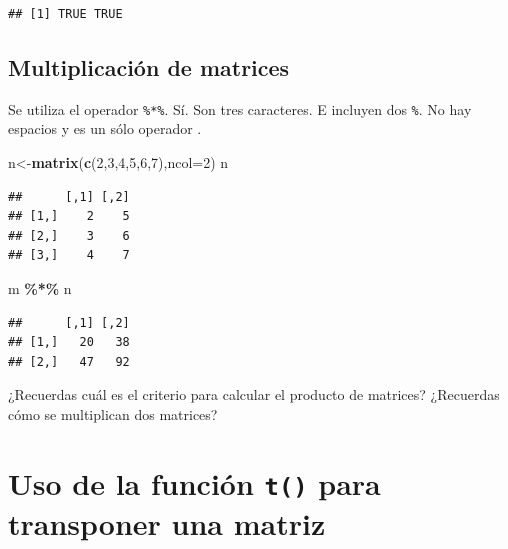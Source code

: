 \documentclass[
]{book}
\newenvironment{Shaded}{\begin{snugshade}}{\end{snugshade}}
\newcommand{\AttributeTok}[1]{\textcolor[rgb]{0.13,0.29,0.53}{#1}}
\newcommand{\DecValTok}[1]{\textcolor[rgb]{0.00,0.00,0.81}{#1}}
\newcommand{\FunctionTok}[1]{\textcolor[rgb]{0.13,0.29,0.53}{\textbf{#1}}}
\newcommand{\NormalTok}[1]{#1}
\newcommand{\OtherTok}[1]{\textcolor[rgb]{0.56,0.35,0.01}{#1}}
\newcommand{\SpecialCharTok}[1]{\textcolor[rgb]{0.81,0.36,0.00}{\textbf{#1}}}
\begin{document}
\begin{verbatim}
## [1] TRUE TRUE
\end{verbatim}

\hypertarget{multiplicaciuxf3n-de-matrices}{%
\subsection{Multiplicación de matrices}\label{multiplicaciuxf3n-de-matrices}}

Se utiliza el operador \texttt{\%*\%}. Sí. Son tres caracteres. E incluyen dos \texttt{\%}.
No hay espacios y es un sólo operador .

\begin{Shaded}
\begin{Highlighting}[]
\NormalTok{n}\OtherTok{\textless{}{-}}\FunctionTok{matrix}\NormalTok{(}\FunctionTok{c}\NormalTok{(}\DecValTok{2}\NormalTok{,}\DecValTok{3}\NormalTok{,}\DecValTok{4}\NormalTok{,}\DecValTok{5}\NormalTok{,}\DecValTok{6}\NormalTok{,}\DecValTok{7}\NormalTok{),}\AttributeTok{ncol=}\DecValTok{2}\NormalTok{)}
\NormalTok{n}
\end{Highlighting}
\end{Shaded}

\begin{verbatim}
##      [,1] [,2]
## [1,]    2    5
## [2,]    3    6
## [3,]    4    7
\end{verbatim}

\begin{Shaded}
\begin{Highlighting}[]
\NormalTok{m }\SpecialCharTok{\%*\%}\NormalTok{ n }
\end{Highlighting}
\end{Shaded}

\begin{verbatim}
##      [,1] [,2]
## [1,]   20   38
## [2,]   47   92
\end{verbatim}

¿Recuerdas cuál es el criterio para calcular el producto de matrices?
¿Recuerdas cómo se multiplican dos matrices?

\hypertarget{uso-de-la-funciuxf3n-t-para-transponer-una-matriz}{%
\section{\texorpdfstring{Uso de la función \texttt{t()} para transponer una matriz}{Uso de la función t() para transponer una matriz}}\label{uso-de-la-funciuxf3n-t-para-transponer-una-matriz}}
\end{document}
